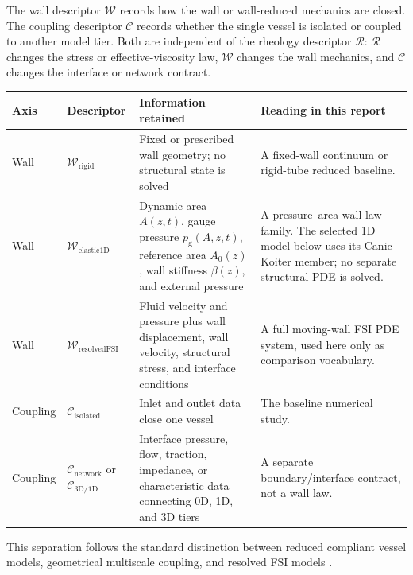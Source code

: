 \begin{definition}
    \label{def:wall-fsi-closure-catalog}
    The wall descriptor $\mathcal W$ records how the wall or wall-reduced
    mechanics are closed. The coupling descriptor $\mathcal C$ records whether
    the single vessel is isolated or coupled to another model tier. Both are
    independent of the rheology descriptor $\mathcal R$: $\mathcal R$ changes
    the stress or effective-viscosity law, $\mathcal W$ changes the wall
    mechanics, and $\mathcal C$ changes the interface or network contract.
    \begin{center}
    \footnotesize
    \begin{tabularx}{\textwidth}{@{}
        >{\raggedright\arraybackslash}p{}
        >{\raggedright\arraybackslash}p{}
        >{\raggedright\arraybackslash}X
        >{\raggedright\arraybackslash}X
        @{}}
        \toprule
        \textbf{Axis}
            & \textbf{Descriptor}
            & \textbf{Information retained}
            & \textbf{Reading in this report} \\
        \midrule
        Wall
            & $\mathcal W_{\mathrm{rigid}}$
            & Fixed or prescribed wall geometry; no structural state is solved
            & A fixed-wall continuum or rigid-tube reduced baseline. \\
        Wall
            & $\mathcal W_{\mathrm{elastic1D}}$
            & Dynamic area $A(z,t)$, gauge pressure $p_{\mathrm g}(A,z,t)$,
            reference area $A_0(z)$, wall stiffness $\beta(z)$, and external
            pressure
            & A pressure--area wall-law family. The selected 1D model below
            uses its Canic--Koiter member; no separate structural PDE is
            solved. \\
        Wall
            & $\mathcal W_{\mathrm{resolvedFSI}}$
            & Fluid velocity and pressure plus wall displacement, wall velocity,
            structural stress, and interface conditions
            & A full moving-wall FSI PDE system, used here only as comparison
            vocabulary. \\
        Coupling
            & $\mathcal C_{\mathrm{isolated}}$
            & Inlet and outlet data close one vessel
            & The baseline numerical study. \\
        Coupling
            & $\mathcal C_{\mathrm{network}}$ or $\mathcal C_{\mathrm{3D/1D}}$
            & Interface pressure, flow, traction, impedance, or characteristic
            data connecting 0D, 1D, and 3D tiers
            & A separate boundary/interface contract, not a wall law. \\
        \bottomrule
    \end{tabularx}
    \end{center}
    This separation follows the standard distinction between reduced compliant
    vessel models, geometrical multiscale coupling, and resolved FSI models
    \cite[Sec.~2, pp.~253--257]{FormaggiaEtAl2003OneDimensionalBloodFlow}
    \cite{QuarteroniVeneziani2003GeometricalMultiscale}
    \cite{FormaggiaEtAl2007FSICoupling}.
\end{definition}

